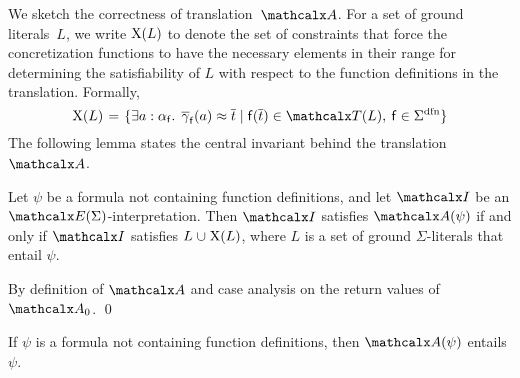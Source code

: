 We sketch the correctness of translation~$\conv$.
For a set of ground literals~$L$, 
we write $\mathrm{X}( L )$ to denote the set of constraints that
force the concretization functions to have the necessary elements in their
range for determining the satisfiability of $L$ with respect to the function
definitions in the translation.
Formally,
\[\absconstraints( L ) \vthinspace=\vthinspace \smash{\{ \exists a : {\fargtype{\con{f}}}.\;\, \vecfarg{\con{f}}( a ) \teq \nobreak \vec t
\nobreak\mid\allowbreak \con{f}( \vec t ) \in \terms( L ),\: \con{f} \in \sfundefs{\Sigma}
\}}\]
The following lemma states the central invariant behind the translation $\conv$.

\begin{lemma}\label{lem:conv}
Let $\psi$ be a formula not containing function definitions,
and let $\I$ be an $\extendsig{\Sigma}$-interpretation.
Then $\I$ satisfies $\conv( \psi )$ if and only if
$\I$ satisfies $L \cup \absconstraints( L )$, where $L$ is a set of ground $\Sigma$-literals that entail $\psi$.
\end{lemma}
\begin{proofsketch}
By definition of $\conv$ and case analysis on the return values of $\conv_0$.
\qed
\end{proofsketch}

\begin{corollary}\label{cor:conv}
If $\psi$ is a formula not containing function definitions, then $\conv( \psi )$ entails $\psi$.
\end{corollary}

